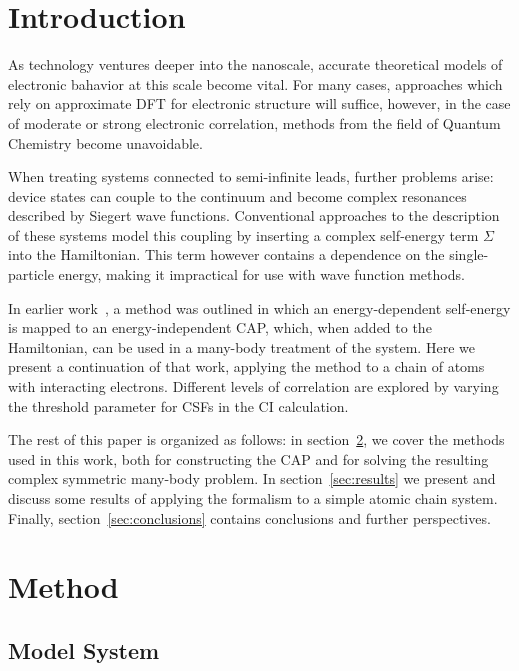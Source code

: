 \section{Introduction}

As technology ventures deeper into the nanoscale, accurate theoretical models
of electronic bahavior at this scale become vital. For many cases, approaches
which rely on approximate \ac{DFT} for electronic structure will suffice,
however, in the case of moderate or strong electronic correlation, methods from
the field of Quantum Chemistry become unavoidable.

When treating systems connected to semi-infinite leads, further problems arise:
device states can couple to the continuum and become complex resonances
described by Siegert wave functions. Conventional approaches to the description
of these systems model this coupling by inserting a complex self-energy term
$\Sigma$ into the Hamiltonian. This term however contains a dependence on the
single-particle energy, making it impractical for use with wave function
methods.

In earlier work~\cite{henderson}, a method was outlined in which an
energy-dependent self-energy is mapped to an energy-independent
\ac{CAP}, which, when added to the Hamiltonian, can be used
in a many-body treatment of the system. Here we present a continuation of that
work, applying the method to a chain of atoms with interacting electrons.
Different levels of correlation are explored by varying the threshold
parameter for \acp{CSF} in the \ac{CI} calculation.

The rest of this paper is organized as follows: in section~\ref{sec:method}, we
cover the methods used in this work, both for constructing the \ac{CAP} and for
solving the resulting complex symmetric many-body problem. In
section~\ref{sec:results} we present and discuss some results of applying the
formalism to a simple atomic chain system. Finally,
section~\ref{sec:conclusions} contains conclusions and further perspectives.


\section{Method}
\label{sec:method}

\subsection{Model System}
\label{subsec:modelsystem}

